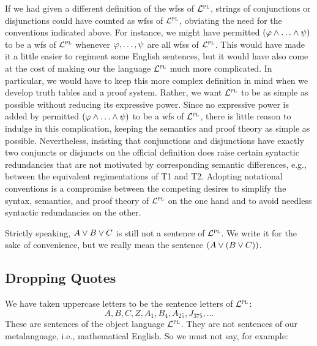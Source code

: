 If we had given a different definition of the wfss of $\mathcal{L}^{\textsc{pl}}$, strings of conjunctions or disjunctions could have counted as wfss of $\mathcal{L}^{\textsc{pl}}$, obviating the need for the conventions indicated above.
For instance, we might have permitted $(\varphi \wedge \ldots \wedge \psi)$ to be a wfs of $\mathcal{L}^{\textsc{pl}}$ whenever $\varphi, \ldots, \psi$ are all wfss of $\mathcal{L}^{\textsc{pl}}$.
This would have made it a little easier to regiment some English sentences, but it would have also come at the cost of making our the language $\mathcal{L}^{\textsc{pl}}$ much more complicated.
In particular, we would have to keep this more complex definition in mind when we develop truth tables and a proof system.
Rather, we want $\mathcal{L}^{\textsc{pl}}$ to be as simple as possible without reducing its expressive power.
Since no expressive power is added by permitted $(\varphi \wedge \ldots \wedge \psi)$ to be a wfs of $\mathcal{L}^{\textsc{pl}}$, there is little reason to indulge in this complication, keeping the semantics and proof theory as simple as possible.
Nevertheless, insisting that conjunctions and disjunctions have exactly two conjuncts or disjuncts on the official definition does raise certain syntactic redundancies that are not motivated by corresponding semantic differences, e.g., between the equivalent regimentations of T1 and T2.
Adopting notational conventions is a compromise between the competing desires to simplify the syntax, semantics, and proof theory of $\mathcal{L}^{\textsc{pl}}$ on the one hand and to avoid needless syntactic redundancies on the other.



Strictly speaking, $A \vee B \vee C$ is still not a sentence of $\mathcal{L}^{\textsc{pl}}$.
We write it for the sake of convenience, but we really mean the sentence $(A \vee (B \vee C))$.




\subsection{Dropping Quotes}
  \label{sub:DropQuote}

We have taken uppercase letters to be the sentence letters of $\mathcal{L}^{\textsc{pl}}$:
	$$A, B, C, Z, A_1, B_4, A_{25}, J_{375},\ldots$$
These are sentences of the object language $\mathcal{L}^{\textsc{pl}}$.
They are not sentences of our metalanguage, i.e., mathematical English.
So we must not say, for example:

